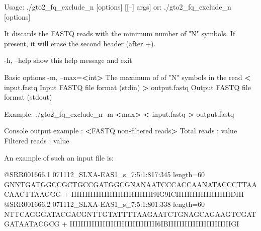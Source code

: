 \documentclass[11pt,]{krantz}
\newenvironment{Shaded}{\begin{snugshade}}{\end{snugshade}}
\newcommand{\StringTok}[1]{\textcolor[rgb]{0.5,0.5,0.5}{#1}}
\newcommand{\OperatorTok}[1]{\textcolor[rgb]{0.43,0.43,0.43}{\textbf{#1}}}
\newcommand{\ExtensionTok}[1]{#1}
\newcommand{\NormalTok}[1]{#1}
\begin{document}
\begin{Shaded}
\begin{Highlighting}[]
\ExtensionTok{Usage}\NormalTok{: ./gto2_fq_exclude_n [options] [[--] args]}
   \ExtensionTok{or}\NormalTok{: ./gto2_fq_exclude_n [options]}

\ExtensionTok{It}\NormalTok{ discards the FASTQ reads with the minimum number of }\StringTok{"N"} 
\ExtensionTok{symbols.} 
\ExtensionTok{If}\NormalTok{ present, it will erase the second header (after +)}\ExtensionTok{.}

    \ExtensionTok{-h}\NormalTok{, --help            show this help message and exit}

\ExtensionTok{Basic}\NormalTok{ options}
    \ExtensionTok{-m}\NormalTok{, --max=}\OperatorTok{<}\NormalTok{int}\OperatorTok{>}\NormalTok{       The maximum of of }\StringTok{"N"}\NormalTok{ symbols in }
                          \ExtensionTok{the}\NormalTok{ read}
    \OperatorTok{<} \ExtensionTok{input.fastq}\NormalTok{         Input FASTQ file format (stdin)}
    \OperatorTok{>} \ExtensionTok{output.fastq}\NormalTok{        Output FASTQ file format (stdout)}

\ExtensionTok{Example}\NormalTok{: ./gto2_fq_exclude_n -m }\OperatorTok{<}\NormalTok{max}\OperatorTok{>} \OperatorTok{<}\NormalTok{ input.fastq }\OperatorTok{>} 
\ExtensionTok{output.fastq}

\ExtensionTok{Console}\NormalTok{ output example :}
\OperatorTok{<}\ExtensionTok{FASTQ}\NormalTok{ non-filtered reads}\OperatorTok{>}
\ExtensionTok{Total}\NormalTok{ reads    : value}
\ExtensionTok{Filtered}\NormalTok{ reads : value}
\end{Highlighting}
\end{Shaded}

An example of such an input file is:

\begin{Shaded}
\begin{Highlighting}[]
\ExtensionTok{@SRR001666.1}\NormalTok{ 071112_SLXA-EAS1_s_7:5:1:817:345 length=60}
\ExtensionTok{GNNTGATGGCCGCTGCCGATGGCGNANAATCCCACCAANATACCCTTAACAACTTAAGGG}
\ExtensionTok{+}
\ExtensionTok{IIIIIIIIIIIIIIIIIIIIIIIIIIIIII9IG9ICIIIIIIIIIIIIIIIIIIIIDIII}
\ExtensionTok{@SRR001666.2}\NormalTok{ 071112_SLXA-EAS1_s_7:5:1:801:338 length=60}
\ExtensionTok{NTTCAGGGATACGACGNTTGTATTTTAAGAATCTGNAGCAGAAGTCGATGATAATACGCG}
\ExtensionTok{+}
\ExtensionTok{IIIIIIIIIIIIIIIIIIIIIIIIIIIIIIII6IBIIIIIIIIIIIIIIIIIIIIIIIGI}
\end{Highlighting}
\end{Shaded}
\end{document}
